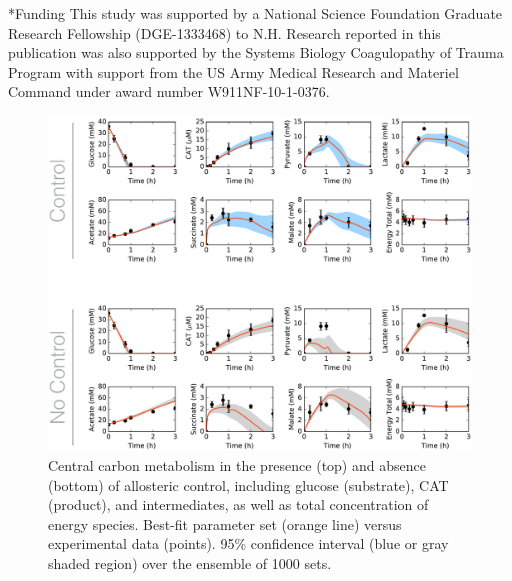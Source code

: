 \documentclass[12pt]{article}
\makeatletter
\renewcommand\section{\@startsection
	{subsection}{2}{0mm}
	{-0.2in}
	{0.05\baselineskip}
	{\normalfont\large\bfseries}}
\makeatother
\begin{document}
\section*{Funding}
This study was supported by a National Science Foundation Graduate Research Fellowship (DGE-1333468) to N.H.
Research reported in this publication was also supported by the Systems Biology Coagulopathy of Trauma Program
with support from the US Army Medical Research and Materiel Command under award number W911NF-10-1-0376.

\clearpage



\clearpage


\begin{figure}[ht]
\centering
\includegraphics[width=1.00\textwidth]{./Figures/Carbon.pdf}
\caption{Central carbon metabolism in the presence (top) and absence (bottom) of allosteric control, including glucose (substrate), CAT (product), and intermediates, as well as total concentration of energy species. Best-fit parameter set (orange line) versus experimental data (points). 95\% confidence interval (blue or gray shaded region) over the ensemble of 1000 sets.}
\label{fig:Carbon}
\end{figure}
\end{document}
